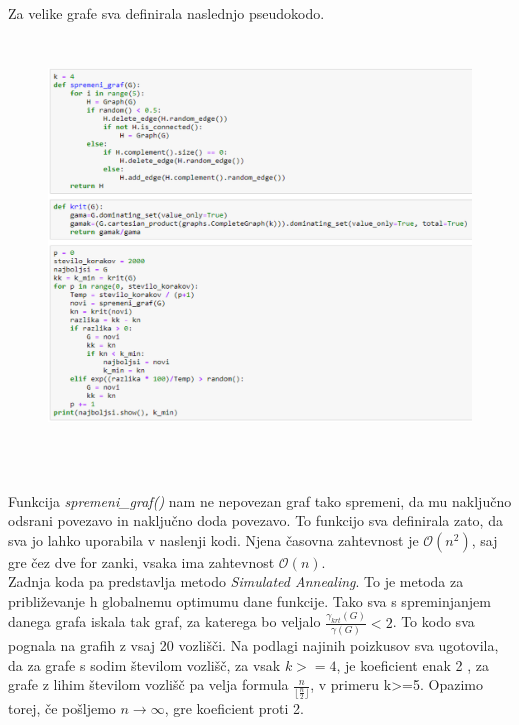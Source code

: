 \documentclass[a4paper]{article}
\begin{document}
Za velike grafe sva definirala naslednjo pseudokodo.
\begin{figure}[h!]
    \centering
    \includegraphics[width=13cm, height=11cm]{Slika4}
    \label{fig:mesh1}
\end{figure}\\
Funkcija \textit{spremeni\_graf()} nam ne nepovezan graf tako spremeni, da mu naključno odsrani povezavo in naključno doda povezavo. To funkcijo sva definirala zato, da sva jo lahko uporabila v naslenji kodi. Njena časovna zahtevnost je $\mathcal{O}(n^2)$, saj gre čez dve for zanki, vsaka ima zahtevnost $\mathcal{O}(n)$.\\
Zadnja koda pa predstavlja metodo \textit{Simulated Annealing}. To je metoda za približevanje h globalnemu optimumu dane funkcije. Tako sva s spreminjanjem danega grafa iskala tak graf, za katerega bo veljalo $\frac{\gamma_{krt}(G)}{\gamma(G)} < 2$. To kodo sva pognala na grafih z vsaj 20 vozlišči. Na podlagi najinih poizkusov sva ugotovila, da za grafe s sodim številom vozlišč, za vsak $k>=4$, je koeficient enak 2 , za grafe z lihim številom vozlišč pa velja formula $\frac{n}{\lfloor{\frac{n}{2}}\rfloor}$, v primeru k>=5. Opazimo torej, če pošljemo $n \rightarrow \infty$, gre koeficient proti 2.\\
\pagebreak
\end{document}
